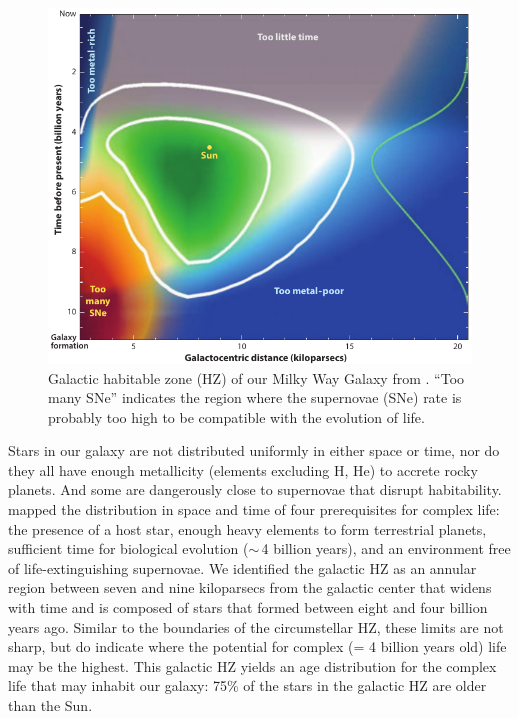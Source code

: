\begin{figure}[!hbt]
	\centering
	\includegraphics[width=1\linewidth]{figures/AnnRevs/AR12.pdf}
	\caption[Galactic habitable zone]{Galactic habitable zone (HZ) of our Milky Way Galaxy from \citet{Lineweaver2004}. ``Too many SNe'' indicates the region where the supernovae (SNe) rate is probably too high to be compatible with the evolution of life.}
	\label{fig:AR12}
\end{figure}

Stars in our galaxy are not distributed uniformly in either space or time, nor do they all have enough metallicity (elements excluding H, He) to accrete rocky planets. And some are dangerously close to supernovae that disrupt habitability. \citet{Lineweaver2004} mapped the distribution in space and time of four prerequisites for complex life: the presence of a host star, enough heavy elements to form terrestrial planets, sufficient time for biological evolution ($\sim$\,4 billion years), and an environment free of life-extinguishing supernovae. We identified the galactic HZ as an annular region between seven and nine kiloparsecs from the galactic center that widens with time and is composed of stars that formed between eight and four billion years ago. Similar to the boundaries of the circumstellar HZ, these limits are not sharp, but do indicate where the potential for complex (= 4 billion years old) life may be the highest. This galactic HZ yields an age distribution for the complex life that may inhabit our galaxy: 75\% of the stars in the galactic HZ are older than the Sun.


